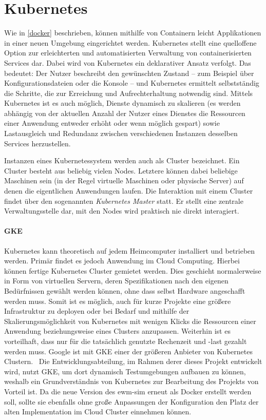 \section{Kubernetes}
Wie in \autoref{docker} beschrieben, können mithilfe von Containern leicht Applikationen in einer neuen Umgebung eingerichtet werden.
Kubernetes stellt eine quelloffene Option zur erleichterten und automatisierten Verwaltung von containerisierten Services dar.
Dabei wird von Kubernetes ein deklarativer Ansatz verfolgt.
Das bedeutet: Der Nutzer beschreibt den gewünschten Zustand -- zum Beispiel über Konfigurationsdateien oder die Konsole -- und Kubernetes ermittelt selbstständig die Schritte, die zur Erreichung und Aufrechterhaltung notwendig sind.
Mittels Kubernetes ist es auch möglich, Dienste dynamisch zu skalieren (\dash es werden abhängig von der aktuellen Anzahl der Nutzer eines Dienstes die Ressourcen einer Anwendung entweder erhöht oder wenn möglich gespart) sowie Lastausgleich und Redundanz zwischen verschiedenen Instanzen desselben Services herzustellen.~\cite{Bloß2019, wasistk8s}

Instanzen eines Kubernetessystem werden auch als Cluster bezeichnet.
Ein Cluster besteht aus beliebig vielen Nodes.
Letztere können dabei beliebige Maschinen sein (in der Regel virtuelle Maschinen oder physische Server) auf denen die eigentlichen Anwendungen laufen.
Die Interaktion mit einem Cluster findet über den sogenannten \emph{Kubernetes Master} statt.
Er stellt eine zentrale Verwaltungsstelle dar, mit den Nodes wird praktisch nie direkt interagiert.~\cite{k8skonzepte}

\paragraph{\ac{GKE}}
Kubernetes kann theoretisch auf jedem Heimcomputer installiert und betrieben werden.
Primär findet es jedoch Anwendung im Cloud Computing.
Hierbei können fertige Kubernetes Cluster gemietet werden.
Dies geschieht normalerweise in Form von virtuellen Servern, deren Spezifikationen nach den eigenen Bedürfnissen gewählt werden können, ohne dass selbst Hardware angeschafft werden muss.
Somit ist es möglich, auch für kurze Projekte eine größere Infrastruktur zu deployen oder bei Bedarf und mithilfe der Skalierungsmöglichkeit von Kubernetes mit wenigen Klicks die Ressourcen einer Anwendung beziehungsweise eines Clusters anzupassen.
Weiterhin ist es vorteilhaft, dass nur für die tatsächlich genutzte Rechenzeit und -last gezahlt werden muss.
Google ist mit \ac{GKE} einer der größeren Anbieter von Kubernetes Clustern.~\cite{gke}
Die Entwicklungsabteilung, im Rahmen derer dieses Projekt entwickelt wird, nutzt \ac{GKE}, um dort dynamisch Testumgebungen aufbauen zu können, weshalb ein Grundverständnis von Kubernetes zur Bearbeitung des Projekts von Vorteil ist.
Da die neue Version des \ac{ewm-sim} erneut als Docker erstellt werden soll, sollte sie ebenfalls ohne große Anpassungen der Konfiguration den Platz der alten Implementation im Cloud Cluster einnehmen können.

